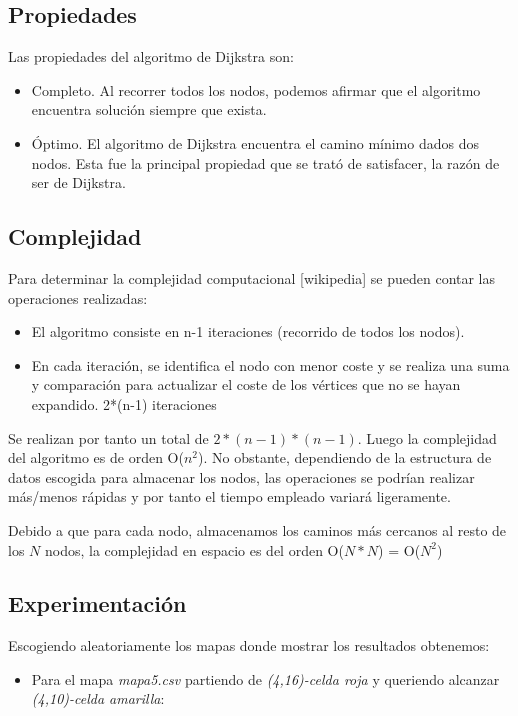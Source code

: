 \documentclass[conference]{IEEEtran}
\begin{document}
{\subsection{Propiedades}

Las propiedades del algoritmo de Dijkstra son:
\begin{itemize}

\item Completo. Al recorrer todos los nodos, podemos afirmar que el algoritmo encuentra solución siempre que exista.
\item Óptimo. El algoritmo de Dijkstra encuentra el camino mínimo dados dos nodos. Esta fue la principal propiedad que se trató de satisfacer, la razón de ser de Dijkstra.

\end{itemize}

\subsection{Complejidad}

Para determinar la complejidad computacional [wikipedia] se pueden contar las operaciones realizadas:
\begin{itemize}
\item El algoritmo consiste en n-1 iteraciones (recorrido de todos los nodos).
\item En cada iteración, se identifica el nodo con menor coste y se realiza una suma y comparación para actualizar el coste de los vértices que no se hayan expandido. 2*(n-1) iteraciones
\end{itemize}

Se realizan por tanto un total de $2*(n-1)*(n-1)$. Luego la complejidad del algoritmo es de orden O($n^2$). No obstante, dependiendo de la estructura de datos escogida para almacenar los nodos, las operaciones se podrían realizar más/menos rápidas y por tanto el tiempo empleado variará ligeramente.

Debido a que para cada nodo, almacenamos los caminos más cercanos al resto de los $N$ nodos, la complejidad en espacio es del orden O($N*N$) = O($N^2$) 

\subsection{Experimentación}

Escogiendo aleatoriamente los mapas donde mostrar los resultados obtenemos:
\begin{itemize}
\item Para el mapa \textit{mapa5.csv} partiendo de \textit{(4,16)-celda roja} y queriendo alcanzar \textit{(4,10)-celda amarilla}:


\end{itemize}}
\end{document}

